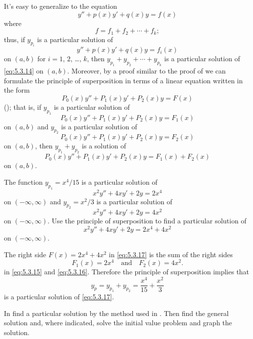 It's easy to generalize  
to the equation
\begin{equation} \label{eq:5.3.14}
y''+p(x)y'+q(x)y=f(x)
\end{equation}
where
\[
f=f_1+f_2+\cdots+f_k;
\]
thus, if $y_{p_i}$ is a particular solution of
\[
y''+p(x)y'+q(x)y=f_i(x)
\]
on $(a,b)$ for $i=1$, $2$, \dots, $k$, then
$y_{p_1}+y_{p_2}+\cdots+y_{p_k}$
is a particular solution of \eqref{eq:5.3.14} on $(a,b)$. Moreover, by a
proof similar to the proof of  we can formulate
the principle of superposition in terms of a linear equation written
in the form
\[
P_0(x)y''+P_1(x)y'+P_2(x)y=F(x)
\]
();
   that is, if $y_{p_1}$
is a particular solution of
\[
P_0(x)y''+P_1(x)y'+P_2(x)y=F_1(x)
\]
on $(a,b)$ and $y_{p_2}$ is a particular solution of
\[
P_0(x)y''+P_1(x)y'+P_2(x)y=F_2(x)
\]
on  $(a,b)$, then $y_{p_1}+y_{p_2}$ is a solution of
\[
P_0(x)y''+P_1(x)y'+P_2(x)y=F_1(x)+F_2(x)
\]
on $(a,b)$.

\begin{example}\label{example:5.3.4}
The function
 $y_{p_1}=x^4/15$ is a   particular solution of
\begin{equation} \label{eq:5.3.15}
x^2y''+4xy'+2y=2x^4
\end{equation}
on $(-\infty,\infty)$
and  $y_{p_2}=x^2/3$  is a particular solution of
\begin{equation} \label{eq:5.3.16}
x^2y''+4xy'+2y=4x^2
\end{equation}
on $(-\infty,\infty)$.
Use  the principle of superposition to
find a particular solution of
\begin{equation} \label{eq:5.3.17}
x^2y''+4xy'+2y=2x^4+4x^2
\end{equation}
on $(-\infty,\infty)$.
\end{example}

\begin{solution}
The right side $F(x)=2x^4+4x^2$ in \eqref{eq:5.3.17}
is the sum of the right sides
\[
F_1(x)=2x^4\quad\text{and}\quad F_2(x)=4x^2.
\]
in  \eqref{eq:5.3.15}  and \eqref{eq:5.3.16}.
Therefore the principle of superposition implies that
\[
y_p=y_{p_1}+y_{p_2}=\frac{x^4}{15}+\frac{x^2}{3}
\]
is a particular solution of \eqref{eq:5.3.17}.
\end{solution}

\exercises

In   find a
particular solution  by the method used in
. Then find the general
solution and, where indicated, solve the initial value problem
and graph the solution.

